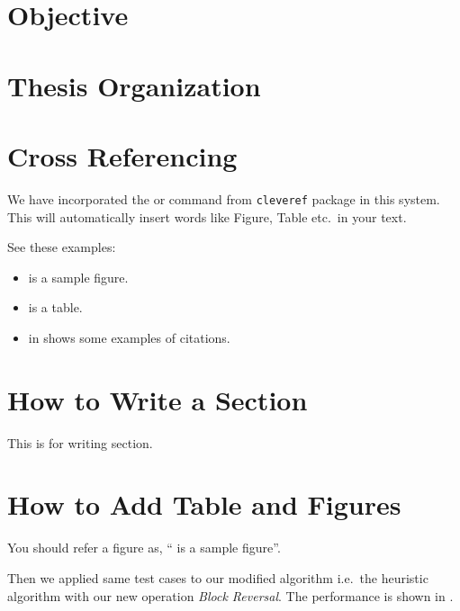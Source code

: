 \section{Objective}

\section{Thesis Organization}



\section{Cross Referencing}
We have incorporated the \verb@\cref@ or \verb@\Cref@ command from
\texttt{cleveref} package in this system. This will automatically
insert words like Figure, Table etc.\ in your text.

See these examples:
\begin{itemize}
\item {} is a sample figure.
\item {} is a table.
\item {} in  shows some examples of
  citations.
\end{itemize}

\section{How to Write a Section}

This is for writing section.

\section{How to Add Table and Figures}\label{contribution}
You should refer a figure as, `` is a sample
figure''.




Then we applied same test cases to our modified algorithm i.e.\ the
heuristic algorithm with our new operation \textit{Block Reversal}. The
performance is shown in .


